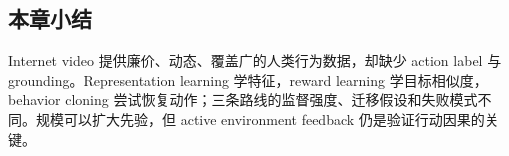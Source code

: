 
\subsection{本章小结}

Internet video 提供廉价、动态、覆盖广的人类行为数据，却缺少 action label 与 grounding。Representation learning 学特征，reward learning 学目标相似度，behavior cloning 尝试恢复动作；三条路线的监督强度、迁移假设和失败模式不同。规模可以扩大先验，但 active environment feedback 仍是验证行动因果的关键。

